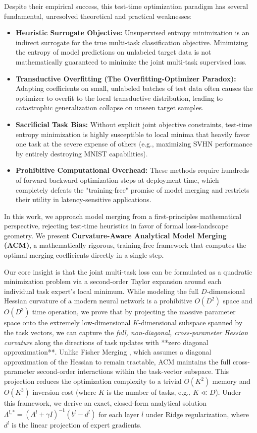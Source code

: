 Despite their empirical success, this test-time optimization paradigm has several fundamental, unresolved theoretical and practical weaknesses:
\begin{itemize}
    \item \textbf{Heuristic Surrogate Objective:} Unsupervised entropy minimization is an indirect surrogate for the true multi-task classification objective. Minimizing the entropy of model predictions on unlabeled target data is not mathematically guaranteed to minimize the joint multi-task supervised loss.
    \item \textbf{Transductive Overfitting (The Overfitting-Optimizer Paradox):} Adapting coefficients on small, unlabeled batches of test data often causes the optimizer to overfit to the local transductive distribution, leading to catastrophic generalization collapse on unseen target samples.
    \item \textbf{Sacrificial Task Bias:} Without explicit joint objective constraints, test-time entropy minimization is highly susceptible to local minima that heavily favor one task at the severe expense of others (e.g., maximizing SVHN performance by entirely destroying MNIST capabilities).
    \item \textbf{Prohibitive Computational Overhead:} These methods require hundreds of forward-backward optimization steps at deployment time, which completely defeats the "training-free" promise of model merging and restricts their utility in latency-sensitive applications.
\end{itemize}

In this work, we approach model merging from a first-principles mathematical perspective, rejecting test-time heuristics in favor of formal loss-landscape geometry. We present \textbf{Curvature-Aware Analytical Model Merging (ACM)}, a mathematically rigorous, training-free framework that computes the optimal merging coefficients directly in a single step. 

Our core insight is that the joint multi-task loss can be formulated as a quadratic minimization problem via a second-order Taylor expansion around each individual task expert's local minimum. While modeling the full $D$-dimensional Hessian curvature of a modern neural network is a prohibitive $O(D^2)$ space and $O(D^3)$ time operation, we prove that by projecting the massive parameter space onto the extremely low-dimensional $K$-dimensional subspace spanned by the task vectors, we can capture the \emph{full, non-diagonal, cross-parameter Hessian curvature} along the directions of task updates with **zero diagonal approximation**. Unlike Fisher Merging \cite{matena2022merging}, which assumes a diagonal approximation of the Hessian to remain tractable, ACM maintains the full cross-parameter second-order interactions within the task-vector subspace. This projection reduces the optimization complexity to a trivial $O(K^2)$ memory and $O(K^3)$ inversion cost (where $K$ is the number of tasks, e.g., $K \ll D$). Under this framework, we derive an exact, closed-form analytical solution $\Lambda^{l, *} = (A^l + \gamma I)^{-1} (b^l - d^l)$ for each layer $l$ under Ridge regularization, where $d^l$ is the linear projection of expert gradients.

